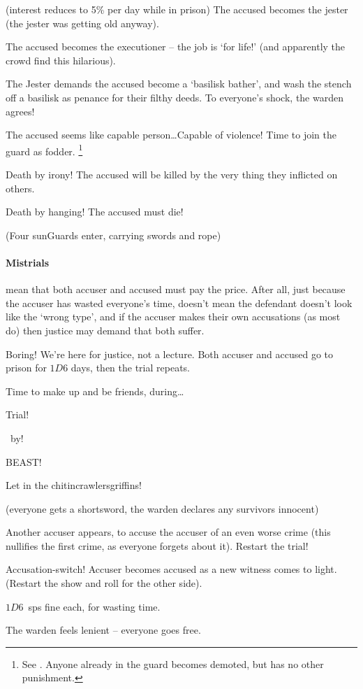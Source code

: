 \begin{multicols}{2}
\begin{dlist}
    (interest reduces to 5\% per day while in prison)
  \else
    The accused becomes the jester (the jester was getting old anyway).
  \fi
  \item
    The accused becomes the executioner -- the job is `for life!' (and apparently the crowd find this hilarious).
  \item
    The Jester demands the accused become a `basilisk bather', and wash the stench off a basilisk as penance for their filthy deeds.
    To everyone's shock, the \gls{warden} agrees!
  \item
  The accused seems like capable person\ldots Capable of violence!
  Time to join the \gls{guard} as fodder.%
  \footnote{See . Anyone already in the \gls{guard} becomes demoted, but has no other punishment.}
  \item
  Death by irony!
  The accused will be killed by the very thing they inflicted on others.
  \item
  Death by hanging!
  The accused must die!

  (Four \glspl{sunGuard} enter, carrying swords and rope)
\end{dlist}

\paragraph{Mistrials}
mean that both accuser and accused must pay the price.
After all, just because the accuser has wasted everyone's time, doesn't mean the defendant doesn't look like the `wrong type', and if the accuser makes their own accusations (as most do) then justice may demand that both suffer.

\label{mistrials}
\begin{dlist}
  \item
  Boring!
  We're here for justice, not a lecture.
  Both accuser and accused go to prison for $1D6$ days, then the trial repeats.
  \item
  Time to make up and be friends, during\ldots

  Trial!

  ~by!

  BEAST!

  Let in the \ifodd\value{r4} chitincrawlers\else griffins\fi!

  (everyone gets a shortsword, the \gls{warden} declares any survivors innocent)
  \item
  Another accuser appears, to accuse the accuser of an even worse crime (this nullifies the first crime, as everyone forgets about it).
  Restart the trial!
  \item
  Accusation-switch!
  Accuser becomes accused as a new witness comes to light.
  (Restart the show and roll for the other side).
  \item
  $1D6$~\glspl{sp} fine each, for wasting time.
  \item
  The \gls{warden} feels lenient -- everyone goes free.
\end{dlist}


\end{multicols}
